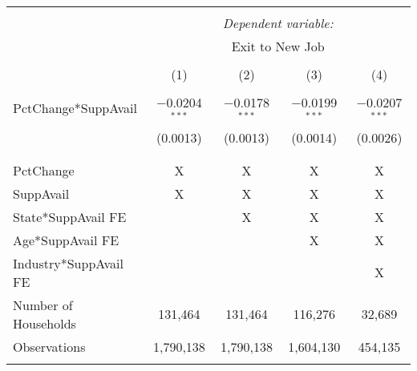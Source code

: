 
\begin{tabular}{@{\extracolsep{5pt}}lcccc} 
\\[-1.8ex]\toprule 
\toprule \\[-1.8ex] 
 & \multicolumn{4}{c}{\textit{Dependent variable:}} \\ 
\cmidrule{2-5} 
 & \multicolumn{4}{c}{Exit to New Job} \\ 
\\[-1.8ex] & (1) & (2) & (3) & (4)\\ 
\midrule \\[-1.8ex] 
 PctChange*SuppAvail & $-$0.0204$^{***}$ & $-$0.0178$^{***}$ & $-$0.0199$^{***}$ & $-$0.0207$^{***}$ \\ 
  & (0.0013) & (0.0013) & (0.0014) & (0.0026) \\ 
  & & & & \\ 
\midrule \\[-1.8ex] 
PctChange & X & X & X & X \\ 
SuppAvail & X & X & X & X \\ 
State*SuppAvail FE &   & X & X & X \\ 
Age*SuppAvail FE &   &   & X & X \\ 
Industry*SuppAvail FE &   &   &   & X \\ 
Number of Households & 131,464 & 131,464 & 116,276 & 32,689 \\ 
Observations & 1,790,138 & 1,790,138 & 1,604,130 & 454,135 \\ 
\bottomrule \\[-1.8ex] 
\end{tabular} 
